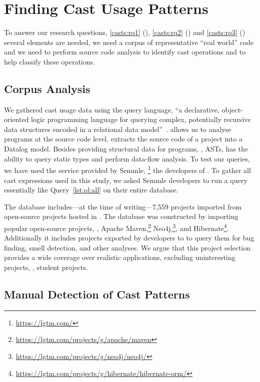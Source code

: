 \section{Finding Cast Usage Patterns}
\label{sec:casts:methodology}

To answer our research questions,
\ref{casts:rq1} (\emph{\crqA}),
\ref{casts:rq2} (\emph{\crqB}) and
\ref{casts:rq3} (\emph{\crqC})
several elements are needed,
we need a corpus of representative ``real world'' code and we need to perform
source code analysis to identify cast operations and to help classify these
operations.


\subsection*{Corpus Analysis}

We gathered cast usage data using the \ql{} query language,
``a declarative, object-oriented logic programming language for querying
complex, potentially recursive data structures encoded in a relational data
model''~\citep{avgustinovQLObjectorientedQueries2016}.
\ql{} allows us to analyse programs at the source code level.
\ql{} extracts the source code of a project into a Datalog model.
Besides providing structural data for programs, \ie{}, ASTs,
\ql{} has the ability to query static types and perform data-flow analysis.
To test our \ql{} queries,
we have used the \lgtm{} service provided by Semmle,%
\footnote{\url{https://lgtm.com/}}
the developers of \ql{}.
To gather all cast expressions used in this study,
we asked Semmle developers to run a query essentially like Query~\ref{lst:ql:all} on their entire database.

The \lgtm{} database includes---at the time of writing---7,559 \java{} projects imported from
open-source projects hosted in \github{}.
The \lgtm{} database was constructed by importing popular open-source projects, \eg{},
Apache Maven,\footnote{\url{https://lgtm.com/projects/g/apache/maven}}
Neo4j,\footnote{\url{https://lgtm.com/projects/g/neo4j/neo4j/}}, and
Hibernate\footnote{\url{https://lgtm.com/projects/g/hibernate/hibernate-orm/}}.
Additionally it includes projects exported by developers
to \lgtm{} to query them for bug finding, smell detection, and
other analyses.
We argue that this project selection provides a wide coverage over realistic
\java{} applications, excluding
uninteresting projects, \eg{}, student projects.


\subsection*{Manual Detection of Cast Patterns}

